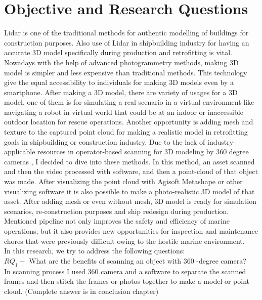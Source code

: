 \section{Objective and Research Questions}
Lidar is one of the traditional methods for authentic modelling of buildings for construction purposes. Also use of Lidar in shipbuilding industry for having an accurate 3D model specifically during production and retrofitting is vital. Nowadays with the help of advanced photogrammetry methods, making 3D model is simpler and less expensive than traditional methods. This technology give the equal accessibility to individuals for making 3D models even by a smartphone. After making a 3D model, there are variety of usages for a 3D model, one of them is for simulating a real scenario in a virtual environment like navigating a robot in virtual world that could be at an indoor or inaccessible outdoor location for rescue operations. Another opportunity is adding mesh and texture to the captured point cloud for making a realistic model in retrofitting goals in shipbuilding or construction industry. Due to the lack of industry-applicable resources in operator-based scanning for 3D modeling by 360 degree cameras , I decided to dive into these methods. In this method, an asset scanned and then the video processed with software, and then a point-cloud of that object was made. After visualizing the  point cloud with Agisoft Metashape or other visualizing software it is also possible to make a photo-realistic 3D model of that asset. After adding mesh or even without mesh, 3D model is ready for simulation scenarios, re-construction purposes and ship redesign during production. Mentioned pipeline not only improves the safety and efficiency of marine operations, but it also provides new opportunities for inspection and maintenance chores that were previously difficult owing to the hostile marine environment.  \\

\noindent In this research, we try to address the following questions:\\

\noindent $RQ_1-$ What are the benefits of scanning an object with 360 -degree camera?  \\

\noindent In scanning process I used 360 camera and a software to separate the scanned frames and then stitch the frames or photos together to make a model or point cloud. (Complete answer is in conclusion chapter)



